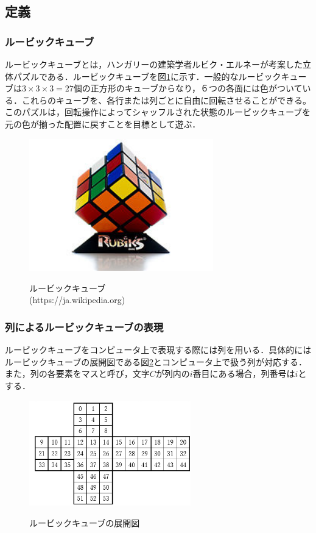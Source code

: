 \documentclass[a4j,titlepage]{jsarticle}
\begin{document}
\subsection{定義}
\subsubsection{ルービックキューブ}
ルービックキューブとは，ハンガリーの建築学者ルビク・エルネーが考案した立体パズルである．ルービックキューブを図\ref{fig:rubik-cube}に示す．一般的なルービックキューブは\(3\times 3\times 3 = 27\)個の正方形のキューブからなり，６つの各面には色がついている．これらのキューブを、各行または列ごとに自由に回転させることができる。このパズルは，回転操作によってシャッフルされた状態のルービックキューブを元の色が揃った配置に戻すことを目標として遊ぶ．

\begin{figure}
  \centering
  \includegraphics[width=8cm]{./tex_pic/rubik-cube.jpg}\\
  \caption{ルービックキューブ\\(https://ja.wikipedia.org)}
  \label{fig:rubik-cube}
\end{figure}

\subsubsection{列によるルービックキューブの表現}
ルービックキューブをコンピュータ上で表現する際には列を用いる．具体的にはルービックキューブの展開図である図\ref{fig:rubik-cube-Dev}とコンピュータ上で扱う列が対応する．また，列の各要素をマスと呼び，文字\(C\)が列内の\(i\)番目にある場合，列番号は\(i\)とする．

\begin{figure}
\centering
  \includegraphics[width=7cm]{./tex_pic/seq.jpg}\\
  \caption{ルービックキューブの展開図}
  \label{fig:rubik-cube-Dev}
\end{figure}
\end{document}
